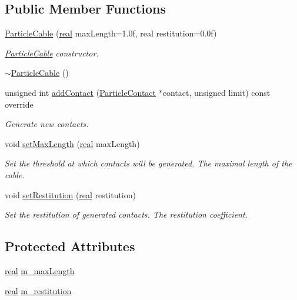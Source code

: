 \subsection*{Public Member Functions}
\begin{DoxyCompactItemize}
\item 
\mbox{\hyperlink{classr3_1_1_particle_cable_afcb568750f7430ec94e34942f766e087}{Particle\+Cable}} (\mbox{\hyperlink{namespacer3_ab2016b3e3f743fb735afce242f0dc1eb}{real}} max\+Length=1.\+0f, real restitution=0.\+0f)
\begin{DoxyCompactList}\small\item\em \mbox{\hyperlink{classr3_1_1_particle_cable}{Particle\+Cable}} constructor. \end{DoxyCompactList}\item 
\mbox{\hyperlink{classr3_1_1_particle_cable_a4ba107749641635a5d7b670eab78c371}{$\sim$\+Particle\+Cable}} ()
\item 
unsigned int \mbox{\hyperlink{classr3_1_1_particle_cable_ac259f6edbf788c0790e6ab72f2fb6800}{add\+Contact}} (\mbox{\hyperlink{classr3_1_1_particle_contact}{Particle\+Contact}} $\ast$contact, unsigned limit) const override
\begin{DoxyCompactList}\small\item\em Generate new contacts. \end{DoxyCompactList}\item 
void \mbox{\hyperlink{classr3_1_1_particle_cable_a6cf3d6cff00fa5a7eeb1df8975cd59de}{set\+Max\+Length}} (\mbox{\hyperlink{namespacer3_ab2016b3e3f743fb735afce242f0dc1eb}{real}} max\+Length)
\begin{DoxyCompactList}\small\item\em Set the threshold at which contacts will be generated.  The maximal length of the cable. \end{DoxyCompactList}\item 
void \mbox{\hyperlink{classr3_1_1_particle_cable_a070f8df68fbf2b7a7b758f1c5b22c42c}{set\+Restitution}} (\mbox{\hyperlink{namespacer3_ab2016b3e3f743fb735afce242f0dc1eb}{real}} restitution)
\begin{DoxyCompactList}\small\item\em Set the restitution of generated contacts.  The restitution coefficient. \end{DoxyCompactList}\end{DoxyCompactItemize}
\subsection*{Protected Attributes}
\begin{DoxyCompactItemize}
\item 
\mbox{\hyperlink{namespacer3_ab2016b3e3f743fb735afce242f0dc1eb}{real}} \mbox{\hyperlink{classr3_1_1_particle_cable_a168d7ed5047dc94ae73f7eec4929ab4d}{m\+\_\+max\+Length}}
\item 
\mbox{\hyperlink{namespacer3_ab2016b3e3f743fb735afce242f0dc1eb}{real}} \mbox{\hyperlink{classr3_1_1_particle_cable_ad03466bf1aeecddec5fd0319be7b2e3d}{m\+\_\+restitution}}
\end{DoxyCompactItemize}
